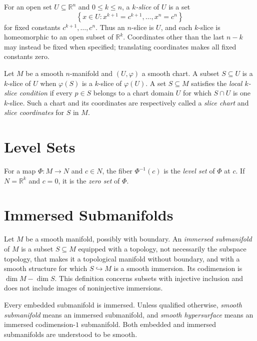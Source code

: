 \begin{definition}
\label{def:5-29-extra-1}




For an open set $U\subseteq\mathbb R^n$ and $0\leq k\leq n$, a
\emph{$k$-slice} of $U$ is a set
\[
 \left\{x\in U:x^{k+1}=c^{k+1},\ldots,x^n=c^n\right\}
\]
for fixed constants $c^{k+1},\ldots,c^n$. Thus an $n$-slice is $U$, and each
$k$-slice is homeomorphic to an open subset of $\mathbb R^k$. Coordinates
other than the last $n-k$ may instead be fixed when specified; translating
coordinates makes all fixed constants zero.

Let $M$ be a smooth $n$-manifold and $(U,\varphi)$ a smooth chart. A subset
$S\subseteq U$ is a $k$-slice of $U$ when $\varphi(S)$ is a $k$-slice of
$\varphi(U)$. A set $S\subseteq M$ satisfies the \emph{local $k$-slice
condition} if every $p\in S$ belongs to a chart domain $U$ for which $S\cap U$
is one $k$-slice. Such a chart and its coordinates are respectively called a
\emph{slice chart} and \emph{slice coordinates} for $S$ in $M$.
\end{definition}



\section{Level Sets}

\begin{definition}
\label{def:5-30-extra-1}



For a map $\Phi:M\to N$ and $c\in N$, the fiber $\Phi^{-1}(c)$ is the
\emph{level set} of $\Phi$ at $c$. If $N=\mathbb R^k$ and $c=0$, it is the
\emph{zero set} of $\Phi$.
\end{definition}


\section{Immersed Submanifolds}

\begin{definition}
\label{def:5-31-extra-1}




Let $M$ be a smooth manifold, possibly with boundary. An \emph{immersed
submanifold} of $M$ is a subset $S\subseteq M$ equipped with a topology, not
necessarily the subspace topology, that makes it a topological manifold without
boundary, and with a smooth structure for which $S\hookrightarrow M$ is a
smooth immersion. Its codimension is $\dim M-\dim S$. This definition concerns
subsets with injective inclusion and does not include images of noninjective
immersions.

Every embedded submanifold is immersed. Unless qualified otherwise,
\emph{smooth submanifold} means an immersed submanifold, and \emph{smooth
hypersurface} means an immersed codimension-$1$ submanifold. Both embedded and
immersed submanifolds are understood to be smooth.
\end{definition}

